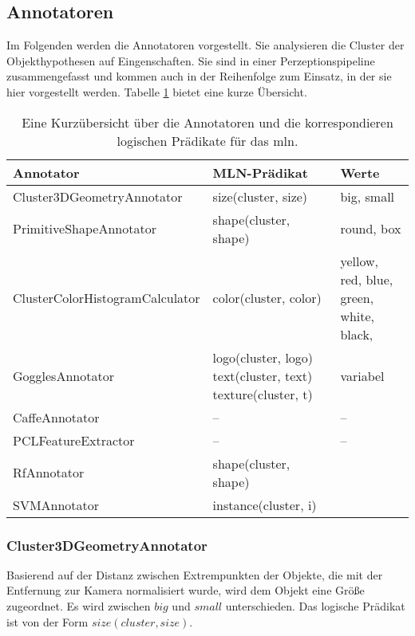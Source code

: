 \subsection{Annotatoren}

Im Folgenden werden die Annotatoren vorgestellt. Sie analysieren die Cluster der Objekthypothesen auf Eingenschaften.  Sie sind in einer Perzeptionspipeline zusammengefasst und kommen auch in der Reihenfolge zum Einsatz, in der sie hier vorgestellt werden. Tabelle \ref{tab:annotators} bietet eine kurze Übersicht.

\begin{table}
\begin{tabularx}{\textwidth}{lXX}
\textbf{Annotator}				& \textbf{MLN-Prädikat}	& \textbf{Werte}	\\ \hline 
Cluster3DGeometryAnnotator		& size(cluster, size)	& big, small	\\ \hline 
PrimitiveShapeAnnotator			& shape(cluster, shape)	& round, box	\\ \hline 
ClusterColorHistogramCalculator  & color(cluster, color)	& yellow, red, blue, green, white, black, \todo{?} \\ \hline 
GogglesAnnotator				& logo(cluster, logo) \newline text(cluster, text) \newline texture(cluster, t) \newline \todo{???mehr}	& 	variabel	\\ \hline 
CaffeAnnotator					& --					& --	\\ \hline 
PCLFeatureExtractor				& --					& --	\\ \hline 
RfAnnotator						& shape(cluster, shape)	&		\\ \hline 
SVMAnnotator					& instance(cluster, i)	&		\\ \hline 
\end{tabularx}
\caption[Kurzübersicht der Annotatoren]{Eine Kurzübersicht über die Annotatoren und die korrespondieren logischen Prädikate für das \gls{mln}.}
\label{tab:annotators}
\end{table}

\subsubsection{Cluster3DGeometryAnnotator}
Basierend auf der Distanz zwischen Extrempunkten der Objekte, die mit der Entfernung zur Kamera normalisiert wurde, wird dem Objekt eine Größe zugeordnet. Es wird zwischen $big$ und $small$ unterschieden. Das logische Prädikat ist von der Form $size(cluster,  size)$. 

